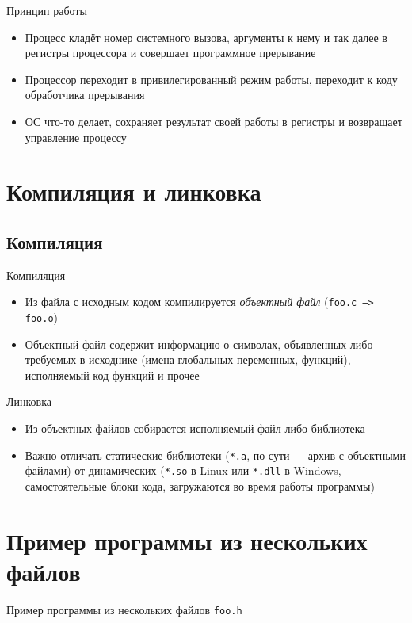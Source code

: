 \documentclass[handout]{beamer}
\begin{document}
\begin{frame}{Принцип работы}
	\begin{itemize}
		\item{Процесс кладёт номер системного вызова, аргументы к нему и так далее в регистры процессора и совершает программное прерывание}\pause
		\item{Процессор переходит в привилегированный режим работы, переходит к коду обработчика прерывания}\pause
		\item{ОС что-то делает, сохраняет результат своей работы в регистры и возвращает управление процессу}
	\end{itemize}
\end{frame}
	
\section{Компиляция и линковка}
\subsection{Компиляция}
\begin{frame}{Компиляция}
	\begin{itemize}
		\item{Из файла с исходным кодом компилируется \emph{объектный файл} (\texttt{foo.c --> foo.o})}
		\item{Объектный файл содержит информацию о символах, объявленных либо требуемых в исходнике (имена глобальных переменных, функций), исполняемый код функций и прочее}
	\end{itemize}
\end{frame}

\begin{frame}{Линковка}
	\begin{itemize}
		\item{Из объектных файлов собирается исполняемый файл либо библиотека}\pause
		\item{Важно отличать статические библиотеки (\texttt{*.a}, по сути --- архив с объектными файлами) от динамических (\texttt{*.so} в Linux или \texttt{*.dll} в Windows, самостоятельные блоки кода, загружаются во время работы программы)}
	\end{itemize}
\end{frame}

\section{Пример программы из нескольких файлов}	
\begin{frame}{Пример программы из нескольких файлов}
	\texttt{foo.h}
	\inputminted[linenos,bgcolor=listing,fontsize=\small]{C}{files/c_programming_langauge/foo.h}
\end{frame}
\end{document}
